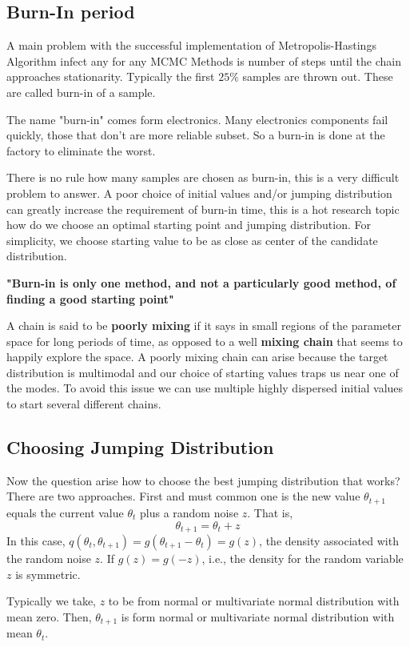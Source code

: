 \subsection{Burn-In period}
A main problem with the successful implementation of Metropolis-Hastings Algorithm infect any for any MCMC Methods is number of steps until the chain approaches stationarity.
Typically the first $ 25\% $ samples are thrown out. These are called burn-in of a sample.

The name "burn-in" comes form electronics. Many electronics components fail quickly, those that don't are more reliable subset. So a burn-in is done at the factory to eliminate the worst.

There is no rule how many samples are chosen as burn-in, this is a very difficult problem to answer. A poor choice of initial values and/or jumping distribution can greatly increase the requirement of burn-in time, this is a hot research topic how do we choose an optimal starting point and jumping distribution. For simplicity, we choose starting value to be as close as center of the candidate distribution.

\textbf{"Burn-in is only one method, and not a particularly good method, of finding a good starting point"}

A chain is said to be \textbf{poorly mixing} if it says in small regions of the parameter
space for long periods of time, as opposed to a well \textbf{mixing chain} that seems to
happily explore the space. A poorly mixing chain can arise because the target
distribution is multimodal and our choice of starting values traps us near one of the modes.
To avoid this issue we can use multiple highly dispersed initial values to start several different chains.

\subsection{Choosing Jumping Distribution}
Now the question arise how to choose the best jumping distribution that works?
There are two approaches. First and must common one is the new value $ \theta_{t+1} $ equals the current value $ \theta_t $ plus a random noise $ z $. That is,
\[
	\theta_{t+1} = \theta_t + z
\]
In this case, $ q(\theta_{t},\theta_{t+1}) = g(\theta_{t+1}-\theta_t) = g(z) $, the density associated with the random noise $ z $. If $ g(z) = g(-z) $, i.e., the density for the random variable $ z $ is symmetric.

Typically we take, $ z $ to be from normal or multivariate normal distribution with mean zero. Then, $ \theta_{t+1} $ is form normal or multivariate normal distribution with mean $ \theta_t $.

